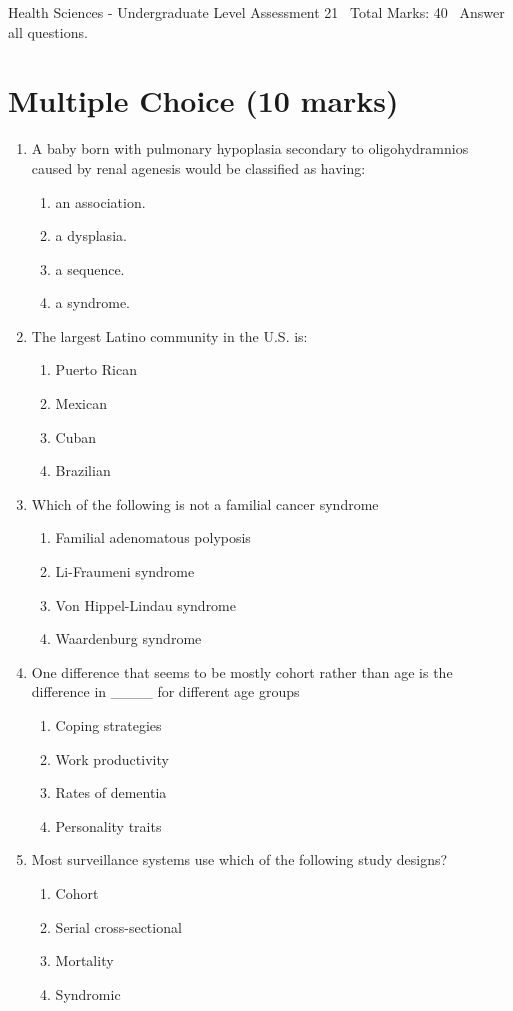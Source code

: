 \documentclass[12pt]{article}
\begin{document}
\begin{center}
Health Sciences - Undergraduate Level Assessment 21 \
Total Marks: 40 \
Answer all questions.
\end{center}

\section*{Multiple Choice (10 marks)}
\begin{enumerate}[label=\arabic*.]
\item A baby born with pulmonary hypoplasia secondary to oligohydramnios caused by renal agenesis would be classified as having:
\begin{enumerate}[label=(\alph*)]
    \item an association.
    \item a dysplasia.
    \item a sequence.
    \item a syndrome.
\end{enumerate}
\item The largest Latino community in the U.S. is:
\begin{enumerate}[label=(\alph*)]
    \item Puerto Rican
    \item Mexican
    \item Cuban
    \item Brazilian
\end{enumerate}
\item Which of the following is not a familial cancer syndrome
\begin{enumerate}[label=(\alph*)]
    \item Familial adenomatous polyposis
    \item Li-Fraumeni syndrome
    \item Von Hippel-Lindau syndrome
    \item Waardenburg syndrome
\end{enumerate}
\item One difference that seems to be mostly cohort rather than age is the difference in \_\_\_\_ for different age groups
\begin{enumerate}[label=(\alph*)]
    \item Coping strategies
    \item Work productivity
    \item Rates of dementia
    \item Personality traits
\end{enumerate}
\item Most surveillance systems use which of the following study designs?
\begin{enumerate}[label=(\alph*)]
    \item Cohort
    \item Serial cross-sectional
    \item Mortality
    \item Syndromic
\end{enumerate}
\end{enumerate}
\end{document}
